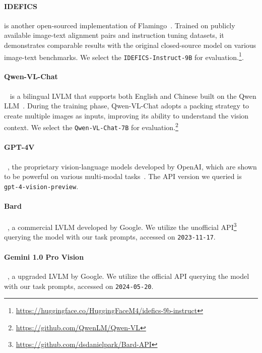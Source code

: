 

\paragraph{IDEFICS} is another open-sourced implementation of Flamingo~\citep{Alayrac2022FlamingoAV}. Trained on publicly available image-text alignment pairs and instruction tuning datasets, it demonstrates comparable results with the original closed-source model on various image-text benchmarks. We select the \texttt{IDEFICS-Instruct-9B} for evaluation.\footnote{\url{https://huggingface.co/HuggingFaceM4/idefics-9b-instruct}}.

\paragraph{Qwen-VL-Chat}~\citep{Qwen-VL} is
a bilingual LVLM that supports both English and Chinese built on the Qwen LLM~\citep{qwen}. 
During the training phase, Qwen-VL-Chat adopts a packing strategy to create multiple images as inputs,
improving its ability to understand the vision context. We select the \texttt{Qwen-VL-Chat-7B} for evaluation.\footnote{\url{https://github.com/QwenLM/Qwen-VL}}



\paragraph{GPT-4V}
~\citep{gpt4v}, the proprietary vision-language models developed by OpenAI, which are shown to be powerful on various multi-modal tasks~\citep{yang2023dawn}. The API version we queried is \texttt{gpt-4-vision-preview}.

\paragraph{Bard}~\citep{bard}, a commercial LVLM developed by Google. We utilize the unofficial API\footnote{\url{https://github.com/dsdanielpark/Bard-API}} querying the model with our task prompts, accessed on \texttt{2023-11-17}.

\paragraph{Gemini 1.0 Pro Vision}~\citep{reid2024gemini}, a upgraded LVLM by Google. We utilize the official API querying the model with our task prompts, accessed on \texttt{2024-05-20}.


